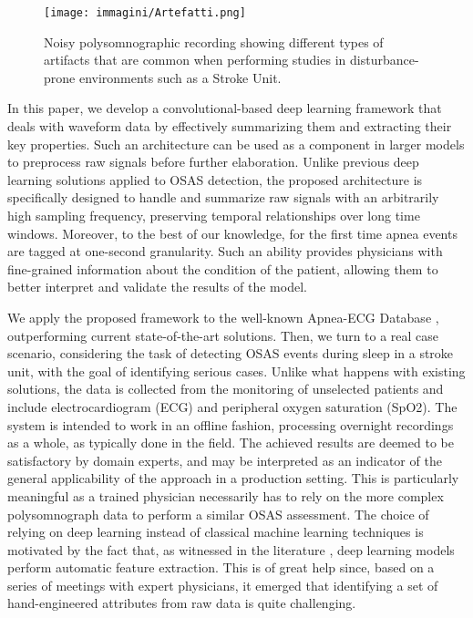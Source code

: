 \documentclass[5p,twocolumn,lefttitle]{elsarticle}
\begin{document}
\begin{figure*}[t]
    \centering
    \texttt{[image: immagini/Artefatti.png]}
    \caption{Noisy polysomnographic recording showing different types of artifacts that are common when performing studies in disturbance-prone environments such as a Stroke Unit.}
    \label{fig:artifacts}
\end{figure*}

In this paper, we develop a convolutional-based deep learning framework that deals with waveform data by effectively summarizing them and extracting their key properties. Such an architecture can be used as a component in larger models to preprocess raw signals before further elaboration. 
Unlike previous deep learning solutions applied to OSAS detection, the proposed architecture is specifically designed to handle and summarize raw signals with an arbitrarily high sampling frequency, preserving temporal relationships over long time windows. Moreover, to the best of our knowledge, for the first time apnea events are tagged at one-second granularity. Such an ability provides physicians with fine-grained information about the condition of the patient, allowing them to better interpret and validate the results of the model.

We apply the proposed framework to the well-known Apnea-ECG Database \cite{penzel2000apnea}, outperforming current state-of-the-art solutions. Then, we turn to a real case scenario, considering the task of detecting OSAS events during sleep in a stroke unit, with the goal of identifying serious cases. Unlike what happens with existing solutions, the data is collected from the monitoring of unselected patients and include electrocardiogram (ECG) and peripheral oxygen saturation (SpO2). The system is intended to work in an offline fashion, processing overnight recordings as a whole, as typically done in the field. The achieved results are deemed to be satisfactory by domain experts, and may be interpreted as an indicator of the general applicability of the approach in a production setting. This is particularly meaningful as a trained physician necessarily has to rely on the more complex polysomnograph data to perform a similar OSAS assessment. 
The choice of relying on deep learning instead of classical machine learning techniques is motivated by the fact that, as witnessed in the literature \cite{goodfellow2016deep}, deep learning models perform automatic feature extraction. This is of great help since, based on a series of meetings with expert physicians, it emerged that identifying a set of hand-engineered attributes from raw data is quite challenging.
\end{document}
